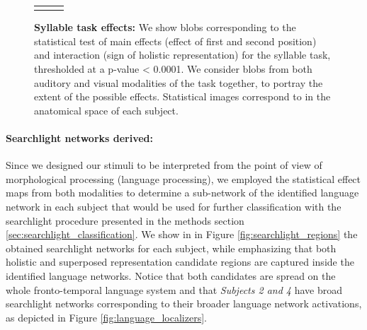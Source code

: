 \begin{figure}[ht]
\begin{tabular}{ccc}
\hspace{-1ex} \\
\end{tabular}
\vspace{3ex}
\caption{\textbf{Syllable task effects:} We show blobs corresponding to the statistical test of main effects (effect of first and second position) and interaction (sign of holistic representation) for the syllable task, thresholded at a p-value < 0.0001.
We consider blobs from both auditory and visual modalities of the task together, to portray the extent of the possible effects. Statistical images correspond to in the anatomical space of each subject.}
\label{fig:syllable_effects}
\end{figure}


\paragraph{Searchlight networks derived:}
Since we designed our stimuli to be interpreted from the point of view of morphological processing (language processing), we employed the statistical effect maps from both modalities to determine a sub-network of the identified language network in each subject that would be used for further classification with the searchlight procedure presented in the methods section \ref{sec:searchlight_classification}.
We show in in Figure \ref{fig:searchlight_regions} the obtained searchlight networks for each subject, while emphasizing that both holistic and superposed representation candidate regions are captured inside the identified language networks.
Notice that both candidates are spread on the whole fronto-temporal language system and that \emph{Subjects 2 and 4} have broad searchlight networks corresponding to their broader language network activations, as depicted in Figure \ref{fig:language_localizers}.


